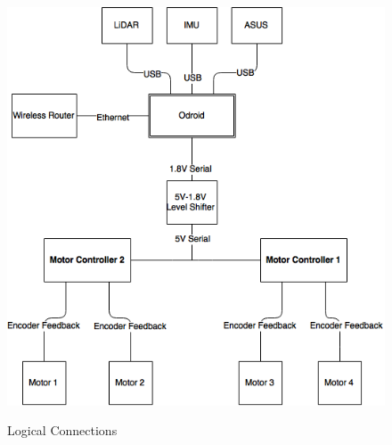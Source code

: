 \begin{figure}[h]
\centering
\includegraphics[width=.75\textwidth]{LogicDiagram.png}
\label{fig:logicdiagram}
\caption{Logical Connections}
\end{figure}